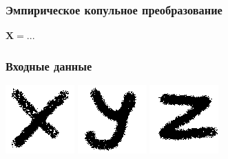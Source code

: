 \documentclass[14pt]{beamer}
\begin{document}
\begin{frame}
    \frametitle{Эмпирическое копульное преобразование}
$\mathbf X = ... $ 
\end{frame}
\begin{frame}
    \frametitle{Входные данные}
    \includegraphics[scale=0.5]{x.png}
    \includegraphics[scale=0.5]{y.png}
    \includegraphics[scale=0.5]{z.png}
\end{frame}
\begin{frame}

\end{frame}
\end{document}
